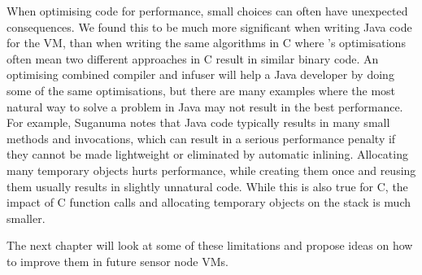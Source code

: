 When optimising code for performance, small choices can often have unexpected consequences. We found this to be much more significant when writing Java code for the VM, than when writing the same algorithms in C where 's optimisations often mean two different approaches in C result in similar binary code. An optimising combined compiler and infuser will help a Java developer by doing some of the same optimisations, but there are many examples where the most natural way to solve a problem in Java may not result in the best performance. For example, Suganuma \cite{Suganuma:2000vl} notes that Java code typically results in many small methods and invocations, which can result in a serious performance penalty if they cannot be made lightweight or eliminated by automatic inlining. Allocating many temporary objects hurts performance, while creating them once and reusing them usually results in slightly unnatural code. While this is also true for C, the impact of C function calls and allocating temporary objects on the stack is much smaller.

The next chapter will look at some of these limitations and propose ideas on how to improve them in future sensor node VMs.

